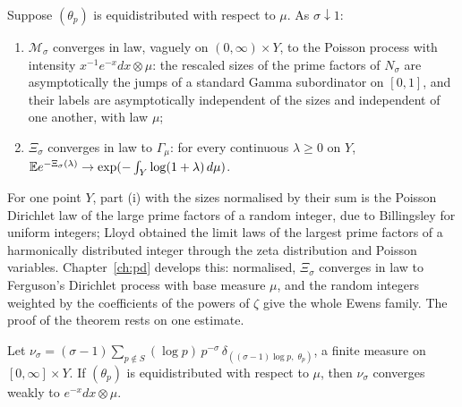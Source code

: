 \begin{theorem}\label{thm:recipgammaproc}
Suppose $(\theta_p)$ is equidistributed with respect to $\mu$. As $\sigma\downarrow1$:
\begin{enumerate}
\item[(i)] $\mathcal M_\sigma$ converges in law, vaguely on $(0,\infty)\times Y$, to the Poisson process with intensity $x^{-1}e^{-x}dx\otimes\mu$: the rescaled sizes of the prime factors of $N_\sigma$ are asymptotically the jumps of a standard Gamma subordinator on $[0,1]$, and their labels are asymptotically independent of the sizes and independent of one another, with law $\mu$;
\item[(ii)] $\Xi_\sigma$ converges in law to $\Gamma_\mu$: for every continuous $\lambda\ge0$ on $Y$, $\mathbb{E} e^{-\Xi_\sigma(\lambda)}\to\exp(-\int_Y\log(1+\lambda)\,d\mu)$.
\end{enumerate}
\end{theorem}

For one point $Y$, part (i) with the sizes normalised by their sum is the Poisson Dirichlet law of the large prime factors of a random integer, due to Billingsley \cite{billingsley1972} for uniform integers; Lloyd \cite{lloyd1984} obtained the limit laws of the largest prime factors of a harmonically distributed integer through the zeta distribution and Poisson variables. Chapter~\ref{ch:pd} develops this: normalised, $\Xi_\sigma$ converges in law to Ferguson's Dirichlet process with base measure $\mu$, and the random integers weighted by the coefficients of the powers of $\zeta$ give the whole Ewens family. The proof of the theorem rests on one estimate.

\begin{lemma}\label{lem:recipnu}
Let $\nu_\sigma=(\sigma-1)\sum_{p\notin S}(\log p)\,p^{-\sigma}\,\delta_{((\sigma-1)\log p,\;\theta_p)}$, a finite measure on $[0,\infty]\times Y$. If $(\theta_p)$ is equidistributed with respect to $\mu$, then $\nu_\sigma$ converges weakly to $e^{-x}dx\otimes\mu$.
\end{lemma}

